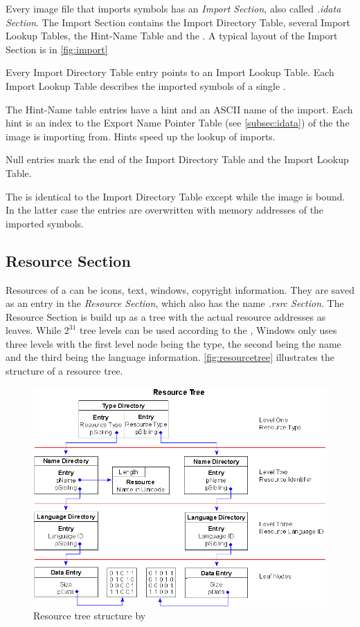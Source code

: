 Every image file that imports symbols has an \emph{Import Section}, also called \emph{.idata Section}.
The Import Section contains the Import Directory Table, several Import Lookup Tables, the Hint-Name Table and the \IAT{}. A typical layout of the Import Section is in \autoref{fig:import}

Every Import Directory Table entry points to an Import Lookup Table. Each Import Lookup Table describes the imported symbols of a single \DLL{}.

The Hint-Name table entries have a hint and an ASCII name of the import. Each hint is an index to the Export Name Pointer Table (see \autoref{subsec:idata}) of the \DLL{} the image is importing from. Hints speed up the lookup of imports.

Null entries mark the end of the Import Directory Table and the Import Lookup Table.

The \IAT{} is identical to the Import Directory Table except while the image is bound. In the latter case the \IAT{} entries are overwritten with memory addresses of the imported symbols.

\subsection*{Resource Section}

Resources of a \PE{} can be \ia{} icons, text, windows, copyright information. They are saved as an entry in the \emph{Resource Section}, which also has the name \emph{.rsrc Section}. The Resource Section is build up as a tree with the actual resource addresses as leaves. While \(2^{31}\) tree levels can be used according to the \PECOFF{} \cite[]{pespec}, Windows only uses three levels with the first level node being the type, the second being the name and the third being the language information. \autoref{fig:resourcetree} illustrates the structure of a resource tree.

\begin{figure}
\includegraphics[width=.98\textwidth, height=\textheight,keepaspectratio]{graphics/resourcetree}
\caption{ Resource tree structure by }
\label{fig:resourcetree} 
\end{figure}

